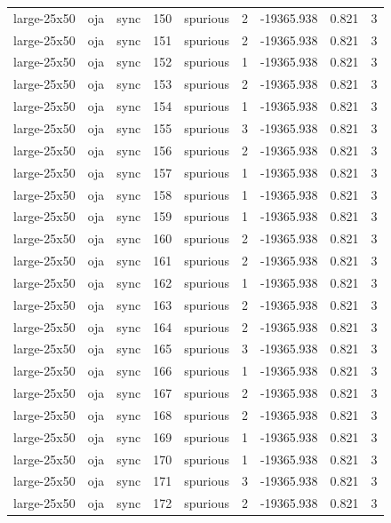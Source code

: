 \begin{tabular}{lllrlrrrr}
large-25x50 & oja & sync & 150 & spurious & 2 & -19365.938 & 0.821 & 3 \\
large-25x50 & oja & sync & 151 & spurious & 2 & -19365.938 & 0.821 & 3 \\
large-25x50 & oja & sync & 152 & spurious & 1 & -19365.938 & 0.821 & 3 \\
large-25x50 & oja & sync & 153 & spurious & 2 & -19365.938 & 0.821 & 3 \\
large-25x50 & oja & sync & 154 & spurious & 1 & -19365.938 & 0.821 & 3 \\
large-25x50 & oja & sync & 155 & spurious & 3 & -19365.938 & 0.821 & 3 \\
large-25x50 & oja & sync & 156 & spurious & 2 & -19365.938 & 0.821 & 3 \\
large-25x50 & oja & sync & 157 & spurious & 1 & -19365.938 & 0.821 & 3 \\
large-25x50 & oja & sync & 158 & spurious & 1 & -19365.938 & 0.821 & 3 \\
large-25x50 & oja & sync & 159 & spurious & 1 & -19365.938 & 0.821 & 3 \\
large-25x50 & oja & sync & 160 & spurious & 2 & -19365.938 & 0.821 & 3 \\
large-25x50 & oja & sync & 161 & spurious & 2 & -19365.938 & 0.821 & 3 \\
large-25x50 & oja & sync & 162 & spurious & 1 & -19365.938 & 0.821 & 3 \\
large-25x50 & oja & sync & 163 & spurious & 2 & -19365.938 & 0.821 & 3 \\
large-25x50 & oja & sync & 164 & spurious & 2 & -19365.938 & 0.821 & 3 \\
large-25x50 & oja & sync & 165 & spurious & 3 & -19365.938 & 0.821 & 3 \\
large-25x50 & oja & sync & 166 & spurious & 1 & -19365.938 & 0.821 & 3 \\
large-25x50 & oja & sync & 167 & spurious & 2 & -19365.938 & 0.821 & 3 \\
large-25x50 & oja & sync & 168 & spurious & 2 & -19365.938 & 0.821 & 3 \\
large-25x50 & oja & sync & 169 & spurious & 1 & -19365.938 & 0.821 & 3 \\
large-25x50 & oja & sync & 170 & spurious & 1 & -19365.938 & 0.821 & 3 \\
large-25x50 & oja & sync & 171 & spurious & 3 & -19365.938 & 0.821 & 3 \\
large-25x50 & oja & sync & 172 & spurious & 2 & -19365.938 & 0.821 & 3 \\

\end{tabular}
